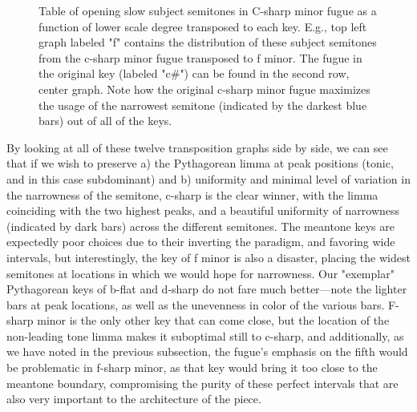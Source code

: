 \begin{figure}[H]
\vspace{1.5em}
    \centering
    \caption[Table of opening slow subject semitones in C-sharp minor fugue as a function of lower scale degree transposed to each key. ]{Table of opening slow subject semitones in C-sharp minor fugue as a function of lower scale degree transposed to each key. E.g., top left graph labeled "f" contains the distribution of these subject semitones from the c-sharp minor fugue transposed to f minor. The fugue in the original key (labeled "c\#") can be found in the second row, center graph. Note how the original c-sharp minor fugue maximizes the usage of the narrowest semitone (indicated by the darkest blue bars) out of all of the keys.}
\end{figure}    By looking at all of these twelve transposition graphs side by side, we
can see that if we wish to preserve a) the Pythagorean limma at peak
positions (tonic, and in this case subdominant) and b) uniformity and
minimal level of variation in the narrowness of the semitone, c-sharp is
the clear winner, with the limma coinciding with the two highest peaks,
and a beautiful uniformity of narrowness (indicated by dark bars) across
the different semitones. The meantone keys are expectedly poor choices
due to their inverting the paradigm, and favoring wide intervals, but
interestingly, the key of f minor is also a disaster, placing the widest
semitones at locations in which we would hope for narrowness. Our
"exemplar" Pythagorean keys of b-flat and d-sharp do not fare much
better---note the lighter bars at peak locations, as well as the
unevenness in color of the various bars. F-sharp minor is the only other
key that can come close, but the location of the non-leading tone limma
makes it suboptimal still to c-sharp, and additionally, as we have noted
in the previous subsection, the fugue's emphasis on the fifth would be
problematic in f-sharp minor, as that key would bring it too close to
the meantone boundary, compromising the purity of these perfect
intervals that are also very important to the architecture of the piece.

